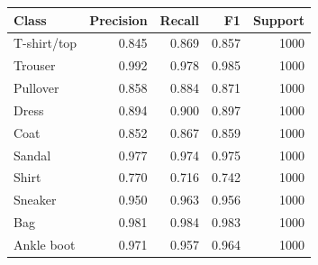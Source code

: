 \begin{tabular}{lrrrr}
\toprule
Class & Precision & Recall & F1 & Support \\
\midrule
T-shirt/top & 0.845 & 0.869 & 0.857 & 1000 \\
Trouser & 0.992 & 0.978 & 0.985 & 1000 \\
Pullover & 0.858 & 0.884 & 0.871 & 1000 \\
Dress & 0.894 & 0.900 & 0.897 & 1000 \\
Coat & 0.852 & 0.867 & 0.859 & 1000 \\
Sandal & 0.977 & 0.974 & 0.975 & 1000 \\
Shirt & 0.770 & 0.716 & 0.742 & 1000 \\
Sneaker & 0.950 & 0.963 & 0.956 & 1000 \\
Bag & 0.981 & 0.984 & 0.983 & 1000 \\
Ankle boot & 0.971 & 0.957 & 0.964 & 1000 \\
\bottomrule
\end{tabular}
